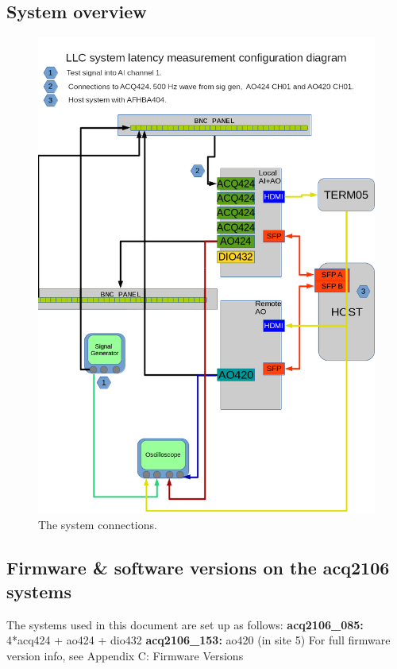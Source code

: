\documentclass{article}
\begin{document}
\subsection{System overview}
\begin{figure}
	\centering
	\includegraphics[width=5.0in]{images/remote_ao_diagram_p.png}
	\caption{The system connections.}
	\label{systemconnections}
\end{figure}

\subsection{Firmware \& software versions on the acq2106 systems}
The systems used in this document are set up as follows: 
\newline
\textbf{acq2106\_085:} 4*acq424 + ao424 + dio432
\newline
\textbf{acq2106\_153:} ao420 (in site 5)
\newline
For full firmware version info, see Appendix C: Firmware Versions
\end{document}
